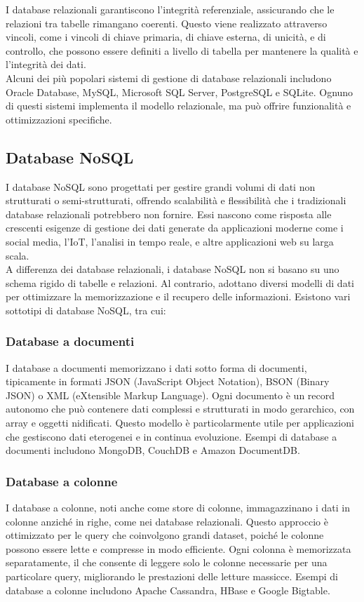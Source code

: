 \documentclass{article}
\begin{document}
I database relazionali garantiscono l'integrità referenziale, assicurando che le relazioni tra tabelle rimangano coerenti. Questo viene realizzato attraverso vincoli, come i vincoli di chiave primaria, di chiave esterna, di unicità, e di controllo, che possono essere definiti a livello di tabella per mantenere la qualità e l'integrità dei dati.\\
Alcuni dei più popolari sistemi di gestione di database relazionali includono Oracle Database, MySQL, Microsoft SQL Server, PostgreSQL e SQLite. Ognuno di questi sistemi implementa il modello relazionale, ma può offrire funzionalità e ottimizzazioni specifiche.\\

\subsection{Database NoSQL}
I database NoSQL sono progettati per gestire grandi volumi di dati non strutturati o semi-strutturati, offrendo scalabilità e flessibilità che i tradizionali database relazionali potrebbero non fornire. Essi nascono come risposta alle crescenti esigenze di gestione dei dati generate da applicazioni moderne come i social media, l'IoT, l'analisi in tempo reale, e altre applicazioni web su larga scala.\\
A differenza dei database relazionali, i database NoSQL non si basano su uno schema rigido di tabelle e relazioni. Al contrario, adottano diversi modelli di dati per ottimizzare la memorizzazione e il recupero delle informazioni. Esistono vari sottotipi di database NoSQL, tra cui:

\subsubsection{Database a documenti}
I database a documenti memorizzano i dati sotto forma di documenti, tipicamente in formati JSON (JavaScript Object Notation), BSON (Binary JSON) o XML (eXtensible Markup Language). Ogni documento è un record autonomo che può contenere dati complessi e strutturati in modo gerarchico, con array e oggetti nidificati. Questo modello è particolarmente utile per applicazioni che gestiscono dati eterogenei e in continua evoluzione. Esempi di database a documenti includono MongoDB, CouchDB e Amazon DocumentDB.

\subsubsection{Database a colonne}
I database a colonne, noti anche come store di colonne, immagazzinano i dati in colonne anziché in righe, come nei database relazionali. Questo approccio è ottimizzato per le query che coinvolgono grandi dataset, poiché le colonne possono essere lette e compresse in modo efficiente. Ogni colonna è memorizzata separatamente, il che consente di leggere solo le colonne necessarie per una particolare query, migliorando le prestazioni delle letture massicce. Esempi di database a colonne includono Apache Cassandra, HBase e Google Bigtable.
\end{document}
